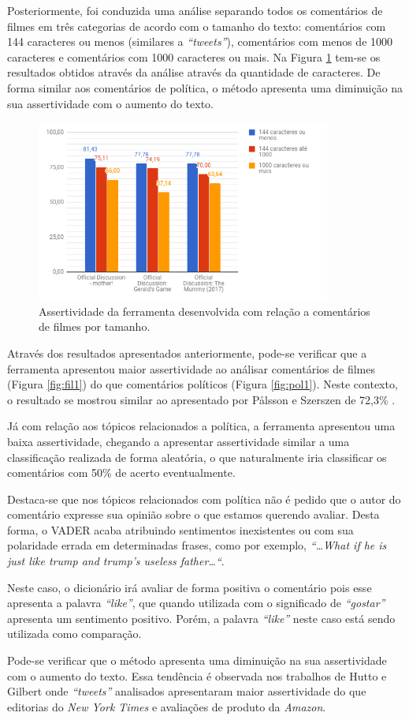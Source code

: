 Posteriormente, foi conduzida uma análise separando
todos os comentários de filmes em três categorias de acordo com o tamanho do
texto: comentários com 144 caracteres ou menos (similares a
\textit{``tweets''}), comentários com menos de 1000 caracteres e comentários com
1000 caracteres ou mais. Na Figura \ref{fig:fil2} tem-se os resultados obtidos através da
análise através da quantidade de caracteres. De forma similar aos comentários
de política, o método apresenta uma diminuição na sua assertividade com o
aumento do texto.

\begin{figure}[!htbp]
\centering
\includegraphics[height=225px]{imagens/filmes2.png}
\caption{Assertividade da ferramenta desenvolvida com relação a comentários de
filmes por tamanho.}
\label{fig:fil2}
\end{figure}

Através dos resultados
apresentados anteriormente, pode-se verificar que a ferramenta apresentou maior
assertividade ao análisar comentários de filmes (Figura \ref{fig:fil1}) do
que comentários políticos (Figura \ref{fig:pol1}).
Neste contexto, o resultado se mostrou similar ao apresentado por Pålsson e
Szerszen de 72,3\% \cite{SentimentinSocialMedia}.

Já com relação aos tópicos relacionados a política, a ferramenta
apresentou uma baixa assertividade, chegando a apresentar assertividade similar
a uma classificação realizada de forma aleatória, o que naturalmente iria
classificar os comentários com 50\% de acerto eventualmente.

Destaca-se que nos tópicos relacionados com
política não é pedido que o autor do comentário expresse sua opinião sobre o
que estamos querendo avaliar. Desta forma, o \ac{VADER} acaba atribuindo
sentimentos inexistentes ou com sua polaridade errada em determinadas frases,
como por exemplo, \textit{``\ldots What if he is just like trump and trump's
useless father\ldots``}. 

Neste caso, o dicionário irá avaliar de forma positiva o
comentário pois esse apresenta a palavra \textit{``like''}, que quando utilizada
com o significado de \textit{``gostar''} apresenta um sentimento positivo.
Porém, a palavra \textit{``like''} neste caso está sendo utilizada como
comparação.

Pode-se verificar que o método apresenta uma diminuição na sua assertividade
com o aumento do texto. Essa tendência é observada nos
trabalhos de Hutto e Gilbert \cite{conf/icwsm/HuttoG14} onde \textit{``tweets''}
analisados apresentaram maior assertividade do que editorias do \textit{New
York Times} e avaliações de produto da \textit{Amazon}.

